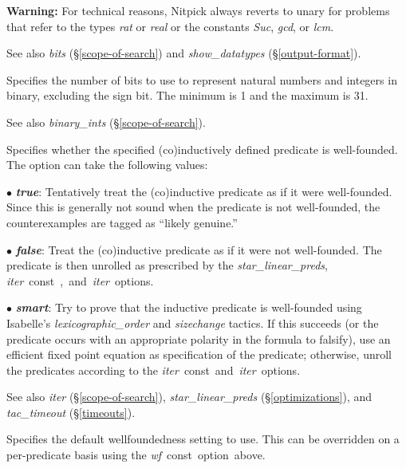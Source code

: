 \documentclass[a4paper,12pt]{article}
\begin{document}
\begin{enum}
\textbf{Warning:} For technical reasons, Nitpick always reverts to unary for
problems that refer to the types \textit{rat} or \textit{real} or the constants
\textit{Suc}, \textit{gcd}, or \textit{lcm}.

{\small See also \textit{bits} (\S\ref{scope-of-search}) and
\textit{show\_datatypes} (\S\ref{output-format}).}

Specifies the number of bits to use to represent natural numbers and integers in
binary, excluding the sign bit. The minimum is 1 and the maximum is 31.

{\small See also \textit{binary\_ints} (\S\ref{scope-of-search}).}

Specifies whether the specified (co)in\-duc\-tively defined predicate is
well-founded. The option can take the following values:

\begin{enum}
\item[$\bullet$] \textbf{\textit{true}}: Tentatively treat the (co)in\-duc\-tive
predicate as if it were well-founded. Since this is generally not sound when the
predicate is not well-founded, the counterexamples are tagged as ``likely
genuine.''

\item[$\bullet$] \textbf{\textit{false}}: Treat the (co)in\-duc\-tive predicate
as if it were not well-founded. The predicate is then unrolled as prescribed by
the \textit{star\_linear\_preds}, \textit{iter}~\qty{const}, and \textit{iter}
options.

\item[$\bullet$] \textbf{\textit{smart}}: Try to prove that the inductive
predicate is well-founded using Isabelle's \textit{lexicographic\_order} and
\textit{sizechange} tactics. If this succeeds (or the predicate occurs with an
appropriate polarity in the formula to falsify), use an efficient fixed point
equation as specification of the predicate; otherwise, unroll the predicates
according to the \textit{iter}~\qty{const} and \textit{iter} options.
\end{enum}

\nopagebreak
{\small See also \textit{iter} (\S\ref{scope-of-search}),
\textit{star\_linear\_preds} (\S\ref{optimizations}), and \textit{tac\_timeout}
(\S\ref{timeouts}).}

Specifies the default wellfoundedness setting to use. This can be overridden on
a per-predicate basis using the \textit{wf}~\qty{const} option above.


\end{enum}
\end{document}
